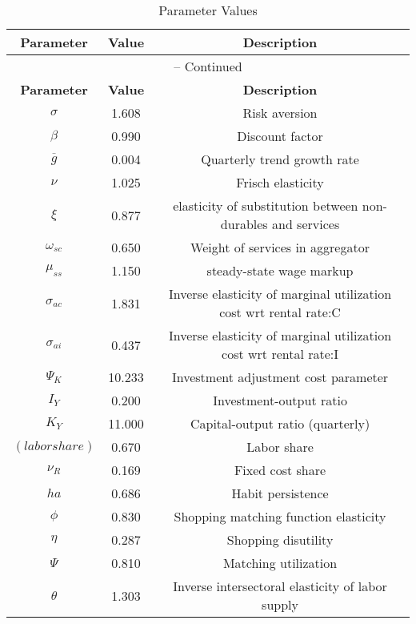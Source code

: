 \begin{center}
\begin{longtable}{ccc}
\caption{Parameter Values}\\%
\toprule%
\multicolumn{1}{c}{\textbf{Parameter}} &
\multicolumn{1}{c}{\textbf{Value}} &
 \multicolumn{1}{c}{\textbf{Description}}\\%
\midrule%
\endfirsthead
\multicolumn{3}{c}{{\tablename} \thetable{} -- Continued}\\%
\midrule%
\multicolumn{1}{c}{\textbf{Parameter}} &
\multicolumn{1}{c}{\textbf{Value}} &
  \multicolumn{1}{c}{\textbf{Description}}\\%
\midrule%
\endhead
${\sigma}$ 	 & 	 1.608 	 & 	 Risk aversion\\
${\beta}$ 	 & 	 0.990 	 & 	 Discount factor\\
${\overline{g}}$ 	 & 	 0.004 	 & 	 Quarterly trend growth rate\\
$\nu$ 	 & 	 1.025 	 & 	 Frisch elasticity\\
$\xi$ 	 & 	 0.877 	 & 	 elasticity of substitution between non-durables and services\\
$\omega_{sc}$ 	 & 	 0.650 	 & 	 Weight of services in aggregator\\
$\mu_{ss}$ 	 & 	 1.150 	 & 	 steady-state wage markup\\
${\sigma_{ac}}$ 	 & 	 1.831 	 & 	 Inverse elasticity of marginal utilization cost wrt rental rate:C\\
${\sigma_{ai}}$ 	 & 	 0.437 	 & 	 Inverse elasticity of marginal utilization cost wrt rental rate:I\\
${\Psi_{K}}$ 	 & 	 10.233 	 & 	 Investment adjustment cost parameter\\
${I_Y}$ 	 & 	 0.200 	 & 	 Investment-output ratio\\
${K_Y}$ 	 & 	 11.000 	 & 	 Capital-output ratio (quarterly)\\
$(labor share)$ 	 & 	 0.670 	 & 	 Labor share\\
${\nu_R}$ 	 & 	 0.169 	 & 	 Fixed cost share\\
${ha}$ 	 & 	 0.686 	 & 	 Habit persistence\\
${\phi}$ 	 & 	 0.830 	 & 	 Shopping matching function elasticity\\
${\eta}$ 	 & 	 0.287 	 & 	 Shopping disutility\\
${\Psi}$ 	 & 	 0.810 	 & 	 Matching utilization\\
${\theta}$ 	 & 	 1.303 	 & 	 Inverse intersectoral elasticity of labor supply\\

\end{longtable}
\end{center}
